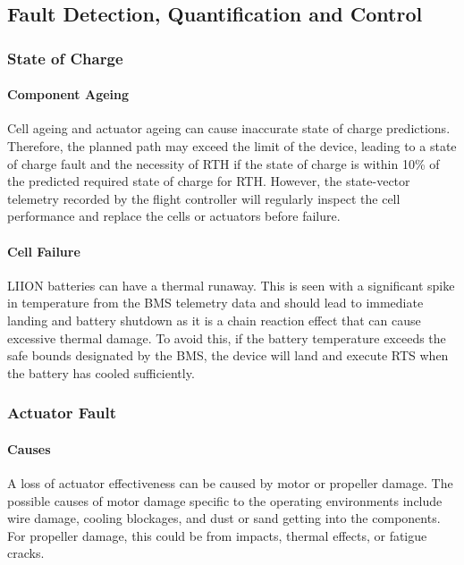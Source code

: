 \subsection{Fault Detection, Quantification and Control}\label{sub_section:tgt_fault_detection}

\subsubsection{State of Charge}\label{sub_sub_section:tgt_SOC}
\paragraph{Component Ageing}
Cell ageing and actuator ageing can cause inaccurate state of charge predictions. Therefore, the planned path may exceed the limit of the device, leading to a state of charge fault and the necessity of \gls{RTH} if the state of charge is within 10\% of the predicted required state of charge for \gls{RTH}. However, the state-vector telemetry recorded by the flight controller will regularly inspect the cell performance and replace the cells or actuators before failure.
\paragraph{Cell Failure}
\gls{LIION} batteries can have a thermal runaway. This is seen with a significant spike in temperature from the \gls{BMS} telemetry data and should lead to immediate landing and battery shutdown as it is a chain reaction effect that can cause excessive thermal damage\cite{LiONRunaway}. To avoid this, if the battery temperature exceeds the safe bounds designated by the \gls{BMS}, the device will land and execute \gls{RTS} when the battery has cooled sufficiently.

\subsubsection{Actuator Fault}\label{sub_sub_section:tgt_actuator_fault}
\paragraph{Causes}
A loss of actuator effectiveness can be caused by motor or propeller damage. The possible causes of motor damage specific to the operating environments include wire damage, cooling blockages, and dust or sand getting into the components. For propeller damage, this could be from impacts, thermal effects, or fatigue cracks.
